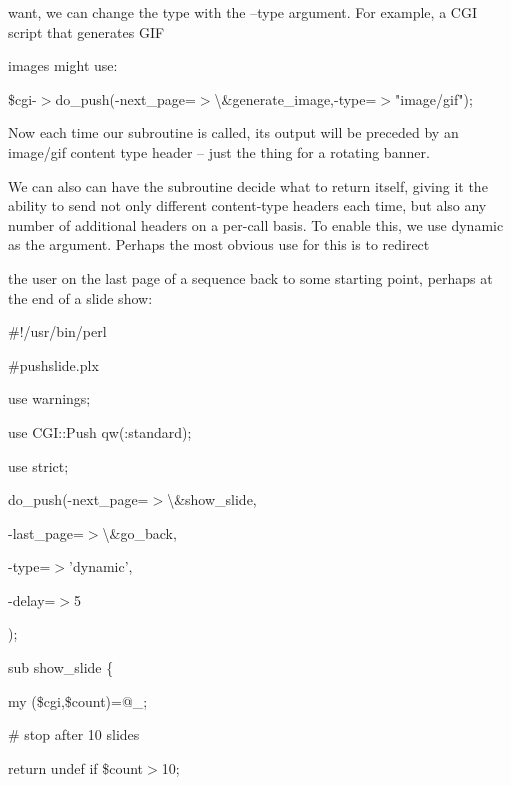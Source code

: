 \documentclass[a4paper,11pt]{book}
\begin{document}
\noindent want, we can change the type with the --type argument. For example, a CGI script that generates GIF

\noindent images might use:

\noindent 

\noindent \$cgi-$>$do\_push(-next\_page=$>$\textbackslash \&generate\_image,-type=$>$"image/gif");

\noindent 

\noindent Now each time our subroutine is called, its output will be preceded by an image/gif content type header -- just the thing for a rotating banner.

\noindent 

\noindent We can also can have the subroutine decide what to return itself, giving it the ability to send not only different content-type headers each time, but also any number of additional headers on a per-call basis. To enable this, we use dynamic as the argument. Perhaps the most obvious use for this is to redirect

\noindent the user on the last page of a sequence back to some starting point, perhaps at the end of a slide show:

\noindent 

\noindent 

\noindent \#!/usr/bin/perl

\noindent \#pushslide.plx

\noindent use warnings;

\noindent use CGI::Push qw(:standard);

\noindent use strict;

\noindent 

\noindent do\_push(-next\_page=$>$\textbackslash \&show\_slide,

\noindent -last\_page=$>$\textbackslash \&go\_back,

\noindent -type=$>$'dynamic',

\noindent -delay=$>$5

\noindent );

\noindent 

\noindent 

\noindent sub show\_slide \{

\noindent my (\$cgi,\$count)=@\_;

\noindent 

\noindent \# stop after 10 slides

\noindent return undef if \$count$>$10;

\noindent 
\end{document}
